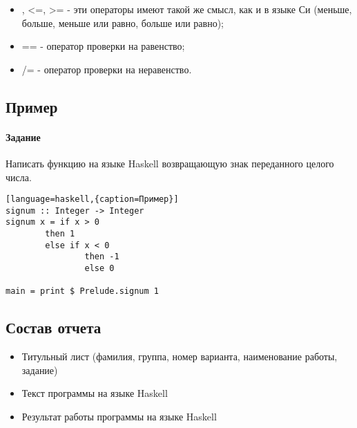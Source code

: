\documentclass[a4paper,12pt]{article}
\begin{document}
\begin{itemize}
	\item <, >, <=, >= - эти операторы имеют такой же смысл, как и в языке Си (меньше, больше, меньше или равно, больше или равно);
	\item == - оператор проверки на равенство;
	\item /= - оператор проверки на неравенство.
\end{itemize}

\subsection{Пример}
\paragraph{Задание}
Написать функцию на языке Haskell возвращающую знак переданного целого числа.

\begin{lstlisting}[language=haskell,{caption=Пример}]
signum :: Integer -> Integer
signum x = if x > 0
        then 1
        else if x < 0
                then -1
                else 0

main = print $ Prelude.signum 1
\end{lstlisting}

\subsection{Состав отчета}
\begin{itemize}
	\item Титульный лист (фамилия, группа, номер варианта, наименование работы, задание)
	\item Текст программы на языке Haskell
	\item Результат работы программы на языке Haskell
\end{itemize}
\end{document}
